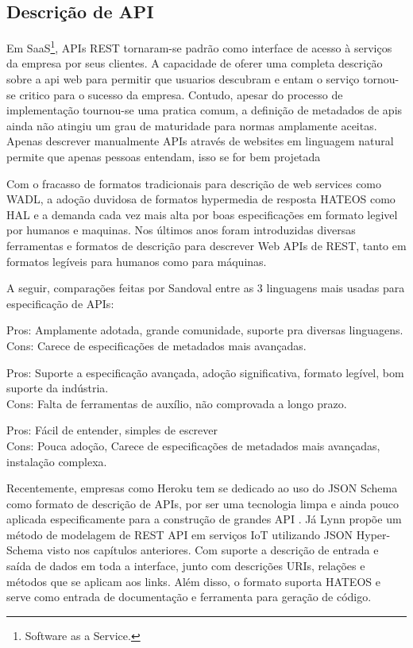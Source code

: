 \subsection[Descrição de API]{Descrição de API}

Em SaaS\footnote{
  Software as a Service.
}, APIs REST tornaram-se padrão como interface de acesso à serviços da empresa por seus clientes. A capacidade de oferer uma completa descrição sobre a api web para permitir que usuarios descubram e entam o serviço tornou-se critico para o sucesso da empresa. Contudo, apesar do processo de implementação tournou-se uma pratica comum, a definição de metadados de apis ainda não atingiu um grau de maturidade para normas amplamente aceitas. Apenas descrever manualmente APIs através de websites em linguagem natural permite que apenas pessoas entendam, isso se for bem projetada \cite{LuckyEtAl2016}

Com o fracasso de formatos tradicionais para descrição de web services como WADL, a adoção duvidosa de formatos hypermedia de resposta HATEOS como HAL e a demanda cada vez mais alta por boas especificações em formato legivel por humanos e maquinas. Nos últimos anos foram introduzidas diversas ferramentas e formatos de descrição para descrever Web APIs de REST, tanto em formatos legíveis para humanos como para máquinas. \cite{LuckyEtAl2016}

A seguir, comparações feitas por Sandoval entre as 3 linguagens mais usadas para especificação de APIs: \cite{Sandoval2015}

\begin{description}[leftmargin=8em,style=nextline]
  \item[\textbf{OpenAPI} (Swagger)] Pros: Amplamente adotada, grande comunidade, suporte pra diversas linguagens. \\ Cons: Carece de especificações de metadados mais avançadas.
  \item[\textbf{RAML}] Pros: Suporte a especificação avançada, adoção significativa, formato legível, bom suporte da indústria. \\ Cons: Falta de ferramentas de auxílio, não comprovada a longo prazo.
  \item[\textbf{API Blueprint}] Pros: Fácil de entender, simples de escrever \\ Cons: Pouca adoção, Carece de especificações de metadados mais avançadas, instalação complexa.
\end{description}

Recentemente, empresas como Heroku tem se dedicado ao uso do JSON Schema como formato de descrição de APIs, por ser uma tecnologia limpa e ainda pouco aplicada especificamente para a construção de grandes API \cite{Leach2014}. Já Lynn propõe um método de modelagem de REST API em serviços IoT utilizando JSON Hyper-Schema visto nos capítulos anteriores. Com suporte a descrição de entrada e saída de dados em toda a interface, junto com descrições URIs, relações e métodos que se aplicam aos links. Além disso, o formato suporta HATEOS e serve como entrada de documentação e ferramenta para geração de código. \cite{LynnEtAl2016}
